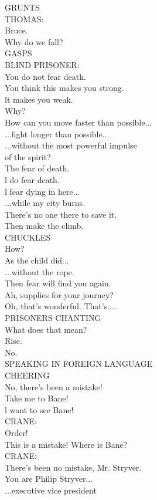 \documentclass{article}
\begin{document}
\begin{multicols}{3}
GRUNTS\\
THOMAS:\\
Bruce.\\
Why do we fall?\\
GASPS\\
BLIND PRISONER:\\
You do not fear death.\\
You think this makes you strong.\\
lt makes you weak.\\
Why?\\
How can you move faster than possible...\\
...fight longer than possible...\\
...without the most powerful impulse\\
of the spirit?\\
The fear of death.\\
l do fear death.\\
l fear dying in here...\\
...while my city burns.\\
There's no one there to save it.\\
Then make the climb.\\
CHUCKLES\\
How?\\
As the child did...\\
...without the rope.\\
Then fear will find you again.\\
Ah, supplies for your journey?\\
Oh, that's wonderful. That's....\\
PRISONERS CHANTING\\
What does that mean?\\
Rise.\\
No.\\
SPEAKING IN FOREIGN LANGUAGE\\
CHEERING\\
No, there's been a mistake!\\
Take me to Bane!\\
l want to see Bane!\\
CRANE:\\
Order!\\
This is a mistake! Where is Bane?\\
CRANE:\\
There's been no mistake, Mr. Stryver.\\
You are Philip Stryver...\\
...executive vice president\\

\end{multicols}
\end{document}
